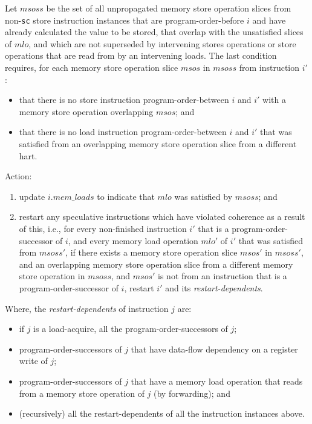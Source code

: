 Let $msoss$ be the set of all unpropagated memory store operation slices from non-{\tt sc} store instruction instances that are program-order-before $i$ and have already calculated the value to be stored, that overlap with the unsatisfied slices of $mlo$, and which are not superseded by intervening stores operations or store operations that are read from by an intervening loads.
The last condition requires, for each memory store operation slice $msos$ in $msoss$ from instruction $i'$:
\begin{itemize}
\item that there is no store instruction program-order-between $i$ and $i'$ with a memory store operation overlapping $msos$; and
\item that there is no load instruction program-order-between $i$ and $i'$ that was satisfied from an overlapping memory store operation slice from a different hart.
\end{itemize}
Action:
\begin{enumerate}
\item update $i.\textit{mem\_loads}$ to indicate that $mlo$ was satisfied by $msoss$; and
\item restart any speculative instructions which have violated coherence as a result of this, i.e., for every non-finished instruction $i'$ that is a program-order-successor of $i$, and every memory load operation $mlo'$ of $i'$ that was satisfied from $msoss'$, if there exists a memory store operation slice $msos'$ in $msoss'$, and an overlapping memory store operation slice from a different memory store operation in $msoss$, and $msos'$ is not from an instruction that is a program-order-successor of $i$, restart $i'$ and its {\em restart-dependents}.
\end{enumerate}
Where, the {\em restart-dependents} of instruction $j$ are:
\begin{itemize}
\item if $j$ is a load-acquire, all the program-order-successors of $j$;
\item program-order-successors of $j$ that have data-flow dependency on a register write of $j$;
\item program-order-successors of $j$ that have a memory load operation that reads from a memory store operation of $j$ (by forwarding); and
\item (recursively) all the restart-dependents of all the instruction instances above.
\end{itemize}


